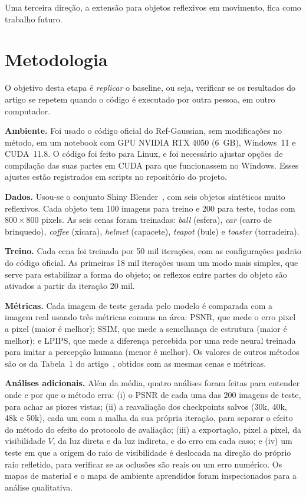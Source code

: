 \documentclass[conference]{IEEEtran}
\begin{document}
Uma terceira direção, a extensão para objetos reflexivos em movimento, fica como trabalho futuro.

\section{Metodologia}\label{sec:exp}

O objetivo desta etapa é \emph{replicar} o baseline, ou seja, verificar se os resultados do artigo se repetem quando o código é executado por outra pessoa, em outro computador.

\textbf{Ambiente.} Foi usado o código oficial do Ref-Gaussian, sem modificações no método, em um notebook com GPU NVIDIA RTX 4050 (6~GB), Windows~11 e CUDA~11.8. O código foi feito para Linux, e foi necessário ajustar opções de compilação das suas partes em CUDA para que funcionassem no Windows. Esses ajustes estão registrados em scripts no repositório do projeto.

\textbf{Dados.} Usou-se o conjunto Shiny Blender~\cite{verbin2022refnerf}, com seis objetos sintéticos muito reflexivos. Cada objeto tem 100 imagens para treino e 200 para teste, todas com $800\times800$ pixels. As seis cenas foram treinadas: \textit{ball} (esfera), \textit{car} (carro de brinquedo), \textit{coffee} (xícara), \textit{helmet} (capacete), \textit{teapot} (bule) e \textit{toaster} (torradeira).

\textbf{Treino.} Cada cena foi treinada por 50 mil iterações, com as configurações padrão do código oficial. As primeiras 18 mil iterações usam um modo mais simples, que serve para estabilizar a forma do objeto; os reflexos entre partes do objeto são ativados a partir da iteração 20 mil.

\textbf{Métricas.} Cada imagem de teste gerada pelo modelo é comparada com a imagem real usando três métricas comuns na área: PSNR, que mede o erro pixel a pixel (maior é melhor); SSIM, que mede a semelhança de estrutura (maior é melhor); e LPIPS, que mede a diferença percebida por uma rede neural treinada para imitar a percepção humana (menor é melhor). Os valores de outros métodos são os da Tabela~1 do artigo~\cite{yao2025refgaussian}, obtidos com as mesmas cenas e métricas.

\textbf{Análises adicionais.} Além da média, quatro análises foram feitas para entender onde e por que o método erra: (i) o PSNR de cada uma das 200 imagens de teste, para achar as piores vistas; (ii) a reavaliação dos checkpoints salvos (30k, 40k, 48k e 50k), cada um com a malha da sua própria iteração, para separar o efeito do método do efeito do protocolo de avaliação; (iii) a exportação, pixel a pixel, da visibilidade $V$, da luz direta e da luz indireta, e do erro em cada caso; e (iv) um teste em que a origem do raio de visibilidade é deslocada na direção do próprio raio refletido, para verificar se as oclusões são reais ou um erro numérico. Os mapas de material e o mapa de ambiente aprendidos foram inspecionados para a análise qualitativa.
\end{document}
